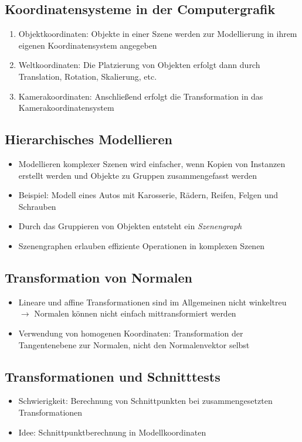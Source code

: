 \subsection{Koordinatensysteme in der Computergrafik}
\begin{enumerate}
	\item Objektkoordinaten: Objekte in einer Szene werden zur Modellierung in ihrem eigenen Koordinatensystem angegeben
	\item Weltkoordinaten: Die Platzierung von Objekten erfolgt dann durch Translation, Rotation, Skalierung, etc.
	\item Kamerakoordinaten: Anschließend erfolgt die Transformation in das Kamerakoordinatensystem
\end{enumerate}


\subsection{Hierarchisches Modellieren}
\begin{itemize}
	\item Modellieren komplexer Szenen wird einfacher, wenn Kopien von Instanzen erstellt werden und Objekte zu Gruppen zusammengefasst werden
	\item Beispiel: Modell eines Autos mit Karosserie, Rädern, Reifen, Felgen und Schrauben
	\item Durch das Gruppieren von Objekten entsteht ein \textit{Szenengraph}
	\item Szenengraphen erlauben effiziente Operationen in komplexen Szenen
\end{itemize}


\subsection{Transformation von Normalen}
\begin{itemize}
	\item Lineare und affine Transformationen sind im Allgemeinen nicht winkeltreu \(\rightarrow\) Normalen können nicht einfach mittransformiert werden
	\item Verwendung von homogenen Koordinaten: Transformation der Tangentenebene zur Normalen, nicht den Normalenvektor selbst
\end{itemize}


\subsection{Transformationen und Schnitttests}
\begin{itemize}
	\item Schwierigkeit: Berechnung von Schnittpunkten bei zusammengesetzten Transformationen
	\item Idee: Schnittpunktberechnung in Modellkoordinaten
\end{itemize}



